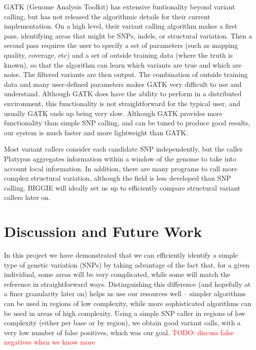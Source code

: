 \documentclass[10pt]{article}
\newcommand\TODO[1]{\textcolor{red}{TODO: #1}}
\begin{document}

GATK (Genome Analysis Toolkit) has extensive funtionality beyond variant calling, but has not released the algorithmic details for their current implementation. On a high level, their variant calling algorithm makes a first pass, identifying areas that might be SNPs, indels, or structural variation. Then a second pass requires the user to specify a set of parameters (such as mapping quality, coverage, etc) and a set of outside training data (where the truth is known), so that the algorithm can learn which variants are true and which are noise. The filtered variants are then output. The combination of outside training data and many user-defined parameters makes GATK very difficult to use and understand. Although
GATK does have the ability to perform in a distributed environment, this
functionality is not straightforward for the typical user, and usually GATK
ends up being very slow.  Although GATK provides more functionality than simple
SNP calling, and can be tuned to produce good results, our system is much faster and more
lightweight than GATK.

Most variant callers consider each candidate SNP independently, but the caller
Platypus aggregates information within a window of the genome to take into
account local information. In addition, there are many programs to call more
complex structural variation, although the field is less developed than SNP
calling.  BIGGIE will ideally set us up to efficiently compare structural variant callers later on.

\section{Discussion and Future Work}

In this project we have demonstrated that we can efficiently identify a simple type of genetic variation (SNPs) by taking advantage of the fact that, for a given individual, some areas will be very complicated, while some will match the reference in straightforward ways. Distinguishing this difference (and hopefully at a finer granularity later on) helps us use our resources well -- simpler algorithms can be used in regions of low complexity, while more sophisticated algorithms can be used in areas of high complexity. Using a simple SNP caller in regions of low complexity (either per base or by region), we obtain good variant calls, with a very low number of false positives, which was our goal. 
\TODO{discuss false negatives when we know more}
\end{document}

